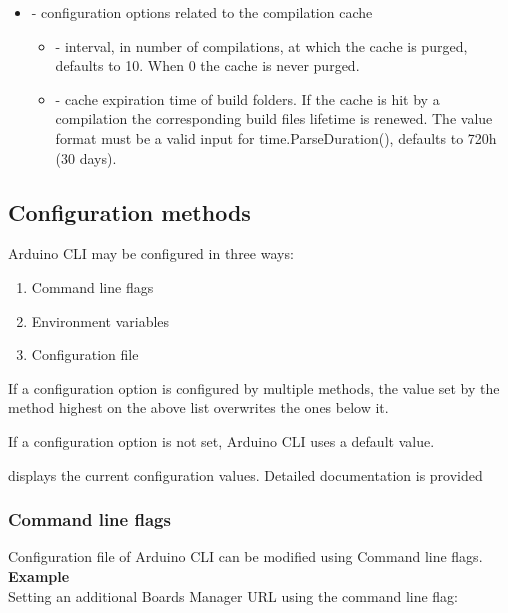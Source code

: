 \begin{itemize}
\begin{itemize}
    \end{itemize}
    \item {} - configuration options related to the compilation cache
    \begin{itemize}
        \item {} - interval, in number of compilations, at which the cache is purged, defaults to 10. When 0 the cache is never purged.
        \item {} - cache expiration time of build folders. If the cache is hit by a compilation the corresponding build files lifetime is renewed. The value format must be a valid input for time.ParseDuration(), defaults to 720h (30 days).
    \end{itemize}
\end{itemize}

\subsection{Configuration methods}
Arduino CLI may be configured in three ways:
\begin{enumerate}
    \item Command line flags
    \item Environment variables
    \item Configuration file
\end{enumerate}

If a configuration option is configured by multiple methods, the value set by the method highest on the above list overwrites the ones below it.

If a configuration option is not set, Arduino CLI uses a default value.

 displays the current configuration values. Detailed documentation is provided \cite{ArduinoCLIDoc:2024}

\subsubsection{Command line flags}
Configuration file of Arduino CLI can be modified using Command line flags.
\\
\textbf{Example}
\\Setting an additional Boards Manager URL using the  command line flag:
\\

